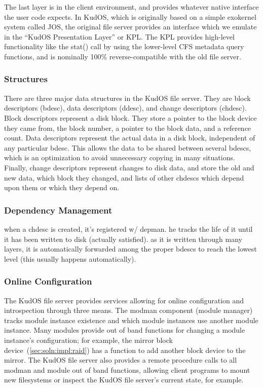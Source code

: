The last layer is in the client environment, and provides whatever native
interface the user code expects. In KudOS, which is originally based on a simple
exokernel system called JOS, the original file server provides an interface
which we emulate in the ``KudOS Presentation Layer'' or KPL. The KPL provides
high-level functionality like the stat() call by using the lower-level CFS
metadata query functions, and is nominally 100\% reverse-compatible with the old
file server.

\subsubsection{Structures}

There are three major data structures in the KudOS file server. They are block
descriptors (bdesc), data descriptors (ddesc), and change descriptors (chdesc).
Block descriptors represent a disk block. They store a pointer to the block
device they came from, the block number, a pointer to the block data, and a
reference count. Data descriptors represent the actual data in a disk block,
independent of any particular bdesc. This allows the data to be shared between
several bdescs, which is an optimization to avoid unnecessary copying in many
situations. Finally, change descriptors represent changes to disk data, and
store the old and new data, which block they changed, and lists of other chdescs
which depend upon them or which they depend on.

\subsubsection{Dependency Management}

when a chdesc is created, it's registered w/ depman. he tracks the
life of it until it has been written to disk (actually satisfied). as
it is written through many layers, it is automatically forwarded
among the proper bdescs to reach the lowest level (this usually
happens automatically).

\subsubsection{Online Configuration}

The KudOS file server provides services allowing for online
configuration and introspection through three means. The modman
component (module manager) tracks module instance existence and which
module instances use another module instance. Many modules provide out
of band functions for changing a module instance's configuration; for
example, the mirror block device~(\ref{sec:soln:impl:raid}) has a
function to add another block device to the mirror. The KudOS file
server also provides a remote procedure calls to all modman and module
out of band functions, allowing client programs to mount new
filesystems or inspect the KudOS file server's current state, for example.

